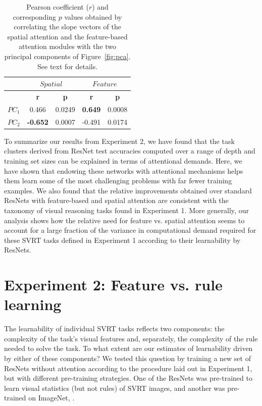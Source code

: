 \begin{table}[ht]
\centering
\begin{center}
    \caption{Pearson coefficient ($r$) and corresponding $p$ values obtained by correlating the slope vectors of the spatial attention and the feature-based attention modules with the two principal components of Figure~\ref{fig:pca}. See text for details.}
    \label{tab:rp}

\end{center}

\begin{tabular}{lcccc} 
\hline 
   & \multicolumn{2}{c}{$Spatial$} & \multicolumn{2}{c}{$Feature$} \\ \hline 
   & \textbf{r }      & \textbf{p }     & \textbf{r }         & \textbf{p }        \\  \hline \hline 
$PC_{1}$ & 0.466                 & 0.0249                & \textbf{0.649}            & 0.0008                  \\ \hline
$PC_{2}$ & \textbf{-0.652}       & 0.0007               & -0.491                   & 0.0174 \\ \hline
\end{tabular}

\end{table}

To summarize our results from Experiment 2,  we have found that the task clusters derived from ResNet test accuracies computed over a range of depth and training set sizes can be explained in terms of attentional demands. Here, we have shown that endowing these networks with attentional mechanisms helps them learn some of the most challenging problems with far fewer training examples. We also found that the relative improvements obtained over standard ResNets with feature-based and spatial attention are consistent with the taxonomy of visual reasoning tasks found in Experiment 1. More generally, our analysis shows how the relative need for feature vs. spatial attention seems to account for a large fraction of the variance in computational demand required for these SVRT tasks defined in Experiment 1 according to their learnability by ResNets. 

\section{Experiment 2: Feature vs. rule learning}

The learnability of individual SVRT tasks reflects two components: the complexity of the task's visual features and, separately, the complexity of the rule needed to solve the task. To what extent are our estimates of learnability driven by either of these components? We tested this question by training a new set of ResNets without attention according to the procedure laid out in Experiment 1, but with different pre-training strategies. One of the ResNets was pre-trained to learn visual statistics (but not rules) of SVRT images, and another was pre-trained on ImageNet, \citep[a popular computer vision dataset containing natural object categories;][]{deng2009imagenet}.


